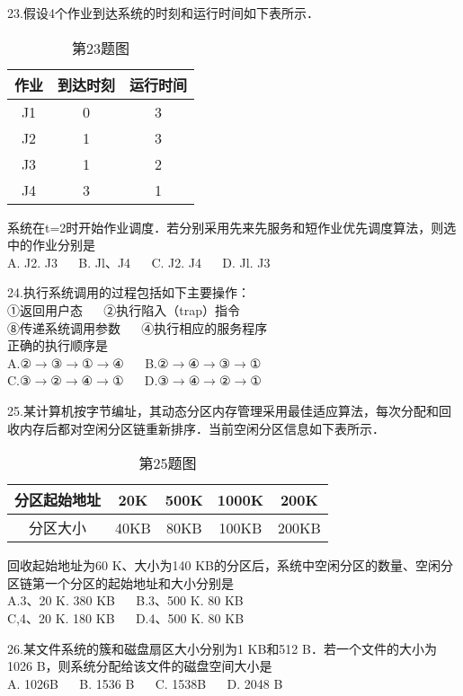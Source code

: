 23.假设4个作业到达系统的时刻和运行时间如下表所示．
\begin{table}[ht]
\centering
\caption{第23题图}\label{CSN17_tab1}
\begin{tabular}{|c|c|c|}
\hline
作业 & 到达时刻 & 运行时间 \\
\hline
J1 & 0 & 3 \\
\hline
J2 & 1 & 3 \\
\hline
J3 & 1 & 2 \\
\hline
J4 & 3 & 1 \\
\hline
\end{tabular}
\end{table}
系统在t=2时开始作业调度．若分别采用先来先服务和短作业优先调度算法，则选中的作业分别是 \\
A. J2. J3  $\quad$  B. Jl、J4  $\quad$  C. J2. J4  $\quad$  D. Jl. J3

24.执行系统调用的过程包括如下主要操作： \\
①返回用户态  $\quad$  ②执行陷入（trap）指令 \\
⑧传递系统调用参数  $\quad$ ④执行相应的服务程序 \\
正确的执行顺序是 \\
A.②$\rightarrow$③$\rightarrow$①$\rightarrow$④ $\quad$ B.②$\rightarrow$④$\rightarrow$③$\rightarrow$① \\
C.③$\rightarrow$②$\rightarrow$④$\rightarrow$① $\quad$ D.③$\rightarrow$④$\rightarrow$②$\rightarrow$①

25.某计算机按字节编址，其动态分区内存管理采用最佳适应算法，每次分配和回收内存后都对空闲分区链重新排序．当前空闲分区信息如下表所示． \\
\begin{table}[ht]
\centering
\caption{第25题图}\label{CSN17_tab2}
\begin{tabular}{|c|c|c|c|c|}
\hline
分区起始地址 & 20K & 500K & 1000K & 200K \\
\hline
分区大小 & 40KB & 80KB & 100KB & 200KB \\
\hline
\end{tabular}
\end{table}
回收起始地址为60 K、大小为140 KB的分区后，系统中空闲分区的数量、空闲分区链第一个分区的起始地址和大小分别是 \\
A.3、20 K. 380 KB  $\quad$  B.3、500 K.  80 KB \\
C,4、20 K.  180 KB  $\quad$  D.4、500 K.  80 KB

26.某文件系统的簇和磁盘扇区大小分别为1 KB和512 B．若一个文件的大小为1026 B，则系统分配给该文件的磁盘空间大小是 \\
A. 1026B  $\quad$  B.  1536 B  $\quad$  C. 1538B  $\quad$  D.  2048 B

